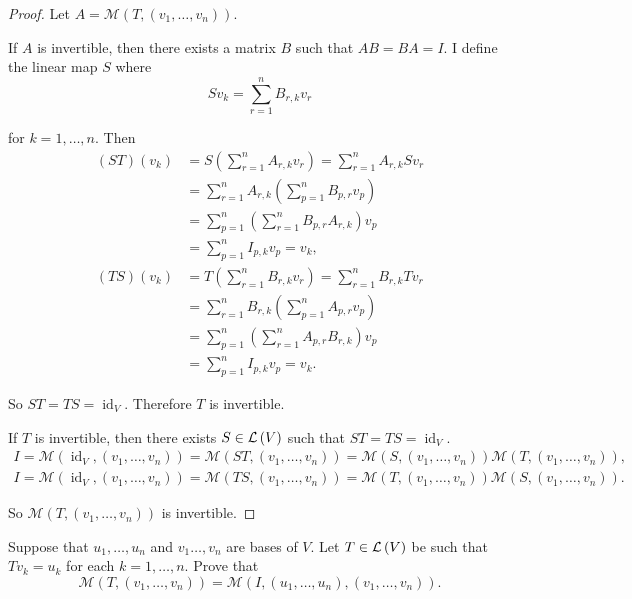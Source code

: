 \begin{proof}
    Let $A = \mathcal{M}(T, (v_{1}, \ldots, v_{n}))$.

    If $A$ is invertible, then there exists a matrix $B$ such that $AB = BA = I$. I define the linear map $S$ where
    \[
        Sv_{k} = \sum^{n}_{r=1}B_{r,k}v_{r}
    \]

    for $k = 1, \ldots, n$. Then
    \begin{align*}
        (ST)(v_{k}) & = S\left(\sum^{n}_{r=1}A_{r,k}v_{r} \right) = \sum^{n}_{r=1}A_{r,k}Sv_{r} \\
                    & = \sum^{n}_{r=1}A_{r,k}\left(\sum^{n}_{p=1}B_{p,r}v_{p}\right)            \\
                    & = \sum^{n}_{p=1}\left(\sum^{n}_{r=1}B_{p,r}A_{r,k}\right)v_{p}            \\
                    & = \sum^{n}_{p=1}I_{p,k}v_{p} = v_{k},                                     \\
        (TS)(v_{k}) & = T\left(\sum^{n}_{r=1}B_{r,k}v_{r}\right) = \sum^{n}_{r=1}B_{r,k}Tv_{r}  \\
                    & = \sum^{n}_{r=1}B_{r,k}\left(\sum^{n}_{p=1}A_{p,r}v_{p}\right)            \\
                    & = \sum^{n}_{p=1}\left(\sum^{n}_{r=1}A_{p,r}B_{r,k}\right)v_{p}            \\
                    & = \sum^{n}_{p=1}I_{p,k}v_{p} = v_{k}.
    \end{align*}

    So $ST = TS = \operatorname{id}_{V}$. Therefore $T$ is invertible.

    If $T$ is invertible, then there exists $S\in\mathcal{L}\left({V}\right)$ such that $ST = TS = \operatorname{id}_{V}$.
    \[
        \begin{split}
            I = \mathcal{M}(\operatorname{id}_{V}, (v_{1}, \ldots, v_{n})) = \mathcal{M}(ST, (v_{1}, \ldots, v_{n})) = \mathcal{M}(S, (v_{1}, \ldots, v_{n}))\mathcal{M}(T, (v_{1}, \ldots, v_{n})), \\
            I = \mathcal{M}(\operatorname{id}_{V}, (v_{1}, \ldots, v_{n})) = \mathcal{M}(TS, (v_{1}, \ldots, v_{n})) = \mathcal{M}(T, (v_{1}, \ldots, v_{n}))\mathcal{M}(S, (v_{1}, \ldots, v_{n})).
        \end{split}
    \]

    So $\mathcal{M}(T, (v_{1}, \ldots, v_{n}))$ is invertible.
\end{proof}
\newpage

\begin{exercise}
    Suppose that $u_{1}, \ldots, u_{n}$ and $v_{1} \ldots, v_{n}$ are bases of $V$. Let $T\in\mathcal{L}\left({V}\right)$ be such that $Tv_{k} = u_{k}$ for each $k = 1,\ldots, n$. Prove that
    \[
        \mathcal{M}(T, (v_{1}, \ldots, v_{n})) = \mathcal{M}(I, (u_{1}, \ldots, u_{n}), (v_{1}, \ldots, v_{n})).
    \]
\end{exercise}

